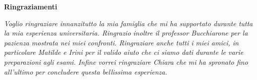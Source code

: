 \thispagestyle{empty}

\begin{center}
  {\bf \Huge Ringraziamenti}
\end{center}

\vspace{4cm}

\emph{Voglio ringraziare innanzitutto la mia famiglia che mi ha supportato durante tutta la mia esperienza universitaria.
Ringrazio inoltre il professor Bucchiarone per la pazienza mostrata nei miei confronti.
Ringraziare anche tutti i miei amici, in particolare Matilde e Irini per il valido aiuto che ci siamo dati durante le varie preparazioni agli esami.
Infine vorrei ringraziare Chiara che mi ha spronato fino all'ultimo per concludere questa bellissima esperienza.
}
